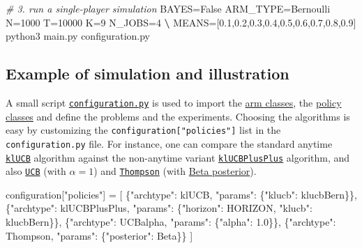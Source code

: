 \documentclass[a4paper,10pt,]{article}
\newenvironment{Shaded}{}{}
\newcommand{\CommentTok}[1]{\textcolor[rgb]{0.38,0.63,0.69}{\textit{#1}}}
\newcommand{\DecValTok}[1]{\textcolor[rgb]{0.25,0.63,0.44}{#1}}
\newcommand{\ExtensionTok}[1]{#1}
\newcommand{\KeywordTok}[1]{\textcolor[rgb]{0.00,0.44,0.13}{\textbf{#1}}}
\newcommand{\NormalTok}[1]{#1}
\newcommand{\OperatorTok}[1]{\textcolor[rgb]{0.40,0.40,0.40}{#1}}
\newcommand{\StringTok}[1]{\textcolor[rgb]{0.25,0.44,0.63}{#1}}
\newcommand{\VariableTok}[1]{\textcolor[rgb]{0.10,0.09,0.49}{#1}}
\begin{document}
\begin{Shaded}
\begin{Highlighting}[]
\CommentTok{# 3. run a single-player simulation}
\NormalTok{\textdollar }\VariableTok{BAYES=}\NormalTok{False }\VariableTok{ARM_TYPE=}\NormalTok{Bernoulli }\VariableTok{N=}\NormalTok{1000 }\VariableTok{T=}\NormalTok{10000 }\VariableTok{K=}\NormalTok{9 }\VariableTok{N_JOBS=}\NormalTok{4 }\KeywordTok{\textbackslash{}}
  \VariableTok{MEANS=}\NormalTok{[}\ExtensionTok{0.1}\NormalTok{,0.2,0.3,0.4,0.5,0.6,0.7,0.8,0.9] python3 main.py configuration.py}
\end{Highlighting}
\end{Shaded}

\subsection{Example of simulation and
illustration}\label{example-of-simulation-and-illustration}

A small script
\href{https://SMPyBandits.GitHub.io/docs/configuration.html}{\texttt{configuration.py}}
is used to import the
\href{https://SMPyBandits.GitHub.io/docs/Arms.html}{arm classes}, the
\href{https://SMPyBandits.GitHub.io/docs/Policies.html}{policy classes}
and define the problems and the experiments. Choosing the algorithms is
easy by customizing the \texttt{configuration{[}"policies"{]}} list in
the \texttt{configuration.py} file. For instance, one can compare the
standard anytime
\href{https://SMPyBandits.GitHub.io/docs/Policies.klUCB.html}{\texttt{klUCB}}
algorithm against the non-anytime variant
\href{https://SMPyBandits.GitHub.io/docs/Policies.klUCBPlusPlus.html}{\texttt{klUCBPlusPlus}}
algorithm, and also
\href{https://SMPyBandits.GitHub.io/docs/Policies.UCBalpha.html}{\texttt{UCB}}
(with \(\alpha=1\)) and
\href{https://SMPyBandits.GitHub.io/docs/Policies.Thompson.html}{\texttt{Thompson}}
(with
\href{https://SMPyBandits.GitHub.io/docs/Policies.Posterior.Beta.html}{Beta
posterior}).

\begin{Shaded}
\begin{Highlighting}[]
\NormalTok{configuration[}\StringTok{"policies"}\NormalTok{] }\OperatorTok{=}\NormalTok{ [}
\NormalTok{  \{}\StringTok{"archtype"}\NormalTok{: klUCB, }\StringTok{"params"}\NormalTok{: \{}\StringTok{"klucb"}\NormalTok{: klucbBern\}\},}
\NormalTok{  \{}\StringTok{"archtype"}\NormalTok{: klUCBPlusPlus, }\StringTok{"params"}\NormalTok{: \{}\StringTok{"horizon"}\NormalTok{: HORIZON, }\StringTok{"klucb"}\NormalTok{: klucbBern\}\},}
\NormalTok{  \{}\StringTok{"archtype"}\NormalTok{: UCBalpha, }\StringTok{"params"}\NormalTok{: \{}\StringTok{"alpha"}\NormalTok{: }\DecValTok{1.0}\NormalTok{\}\},}
\NormalTok{  \{}\StringTok{"archtype"}\NormalTok{: Thompson, }\StringTok{"params"}\NormalTok{: \{}\StringTok{"posterior"}\NormalTok{: Beta\}\}}
\NormalTok{]}
\end{Highlighting}
\end{Shaded}
\end{document}
